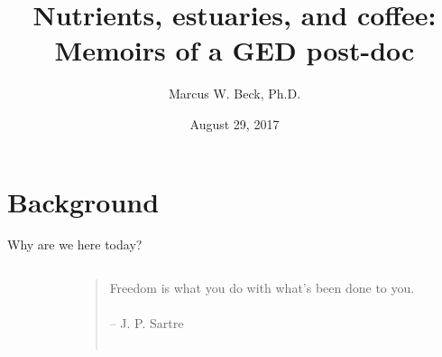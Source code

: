 \documentclass[serif]{beamer}\usepackage[]{graphicx}\usepackage[]{color}
\begin{document}
\title[Memoirs of a GED post-doc]{\textbf{Nutrients, estuaries, and coffee: Memoirs of a GED post-doc}}
\author[M. Beck]{Marcus W. Beck, Ph.D.}


\date{August 29, 2017}


\begin{frame}[shrink]
\titlepage
\end{frame}

\section{Background}

\begin{frame}{Why are we here today?}{}
\begin{columns}
\begin{column}{0.5\textwidth}
\begin{center}
\end{center}
\end{column}
\begin{column}{0.5\textwidth}
\begin{quote}
\Large
Freedom is what you do with what's been done to you.\\~\\
\vspace{0.05in}
\hfill -- J. P. Sartre\\~\\
\end{quote}
\end{column}
\end{columns}
\end{frame}
\end{document}
